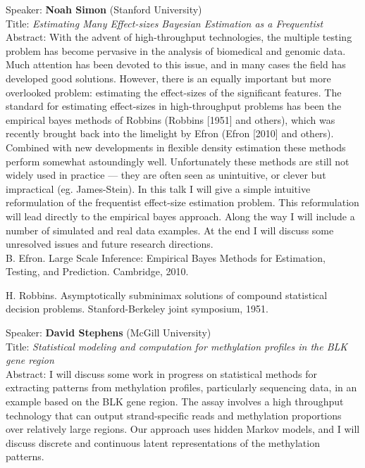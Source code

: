 \documentclass[11pt]{article}
\begin{document}
\bigskip
\noindent
Speaker: {\bf Noah Simon} (Stanford University)\\
Title: {\it Estimating Many Effect-sizes Bayesian Estimation as a Frequentist}\\
Abstract: With the advent of high-throughput technologies, the multiple testing
problem has become pervasive in the analysis of biomedical and genomic
data. Much attention has been devoted to this issue, and in many cases
the field has developed good solutions. However, there is an equally
important but more overlooked problem: estimating the effect-sizes
of the significant features. The standard for estimating
effect-sizes in high-throughput problems has been the empirical
bayes methods of Robbins (Robbins [1951] and others), which was
recently brought back into the limelight by Efron (Efron [2010] and
others). Combined with new developments in flexible density estimation
these methods perform somewhat astoundingly well. Unfortunately these
methods are still not widely used in practice --- they are often seen
as unintuitive, or clever but impractical (eg. James-Stein). In this
talk I will give a simple intuitive reformulation of the frequentist
effect-size estimation problem. This reformulation will lead
directly to the empirical bayes approach. Along the way I will include
a number of simulated and real data examples. At the end I will
discuss some unresolved issues and future research directions.\\

\noindent B. Efron. Large Scale Inference: Empirical Bayes Methods for
Estimation, Testing, and Prediction. Cambridge, 2010.

\noindent H. Robbins. Asymptotically subminimax solutions of compound
statistical decision problems. Stanford-Berkeley joint symposium,
1951.

\bigskip
\noindent
Speaker: {\bf David Stephens} (McGill University)\\
Title: {\it Statistical modeling and computation for methylation profiles in the BLK gene region}\\
Abstract: I will discuss some work in progress on statistical methods for
extracting patterns from methylation profiles,
particularly sequencing data, in an example based on the BLK gene region.
The assay involves a high throughput technology that
can output strand-specific reads and methylation proportions over relatively
large regions.  Our approach
uses hidden Markov models, and I will discuss discrete and continuous latent
representations of the methylation
patterns.\\
\end{document}
